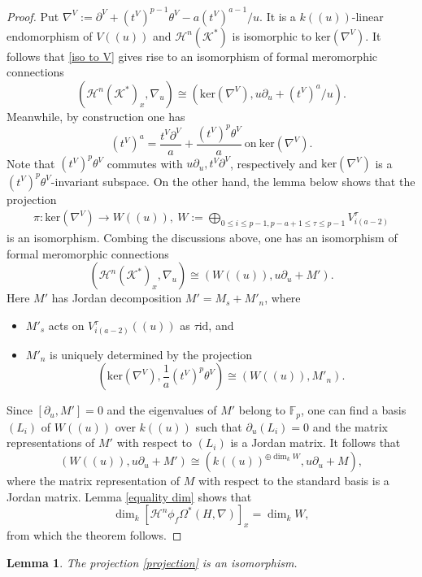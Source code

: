 \documentclass[12pt, a4paper]{article}
\newtheorem{lemma}{Lemma}[section]
\begin{document}
\begin{proof}
Put $\nabla^V:=\partial^V+(t^V)^{p-1}\theta^V-a(t^V)^{a-1}/u$. It is a $k((u))$-linear endomorphism of $V((u))$
and $\mathcal H^n(\mathcal K^*)$ is isomorphic to $\mathrm{ker}(\nabla^V)$. It follows that \eqref{iso to V} gives rise to an isomorphism of formal meromorphic connections
$$
(\mathcal H^n(\mathcal K^*)_x,\nabla_u)\cong(\mathrm{ker}(\nabla^V),u\partial_u+(t^V)^a/u).
$$
Meanwhile, by construction one has
$$
(t^V)^a=\frac{t^V\partial^V}{a}+\frac{(t^V)^p\theta^V}{a}~\mathrm{on}~\mathrm{ker}(\nabla^V).
$$
Note that $(t^V)^p\theta^V$ commutes with $u\partial_u, t^V\partial^V$, respectively and $\mathrm{ker}(\nabla^V)$ is a $(t^V)^p\theta^V$-invariant subspace. 
On the other hand, the lemma below shows that the projection 
\begin{eqnarray}\label{projection}
\pi:\mathrm{ker}(\nabla^V)\to W((u)),~W:=\bigoplus_{0\leq i\leq p-1,p-a+1\leq\tau\leq p-1}V_{i(a-2)}^\tau
\end{eqnarray}
is an isomorphism. Combing the discussions above, one has an isomorphism of formal meromorphic connections
$$
(\mathcal H^n(\mathcal K^*)_x,\nabla_u)\cong(W((u)),u\partial_u+M').
$$
Here $M'$ has Jordan decomposition $M'=M_s+M'_n$, where 
\begin{itemize}
\item $M'_s$ acts on $V_{i(a-2)}^\tau((u))$ as $\tau\mathrm{id}$, and
\item $M'_n$ is uniquely determined by the projection
$$
(\mathrm{ker}(\nabla^V),\frac{1}{a}(t^V)^p\theta^V)\cong(W((u)),M'_n).
$$
\end{itemize}
Since $[\partial_u,M']=0$ and the eigenvalues of $M'$ belong to $\mathbb F_p$, one can find a basis $(L_i)$ of $W((u))$ over $k((u))$ such that $\partial_u(L_i)=0$ and the matrix representations of $M'$ with respect to $(L_i)$ is a Jordan matrix. It follows that 
$$
(W((u)),u\partial_u+M')\cong(k((u))^{\oplus\dim_kW},u\partial_u+M),
$$
where the matrix representation of $M$ with respect to the standard basis is a Jordan matrix.
Lemma \ref{equality dim} shows that 
 $$
 \dim_k[\mathcal H^n\phi_f\Omega^*(H,\nabla)]_x=\dim_k W,$$
 from which the theorem follows.
\end{proof}
\begin{lemma}
The projection \eqref{projection} is an isomorphism.
\end{lemma}
\end{document}
